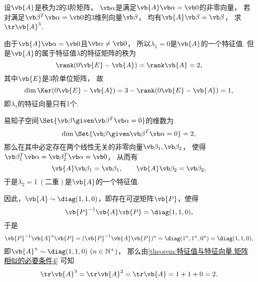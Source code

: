 \begin{example}
设\(\vb{A}\)是秩为2的3阶矩阵，
\(\vb\alpha\)是满足\(\vb{A} \vb\alpha = \vb0\)的非零向量，
若对满足\(\vb\beta^T \vb\alpha = \vb0\)的3维列向量\(\vb\beta\)，
均有\(\vb{A} \vb\beta = \vb\beta\)，
求\(\tr\vb{A}^3\).
\begin{solution}
由于\(\vb{A} \vb\alpha = \vb0\)且\(\vb\alpha \neq \vb0\)，
所以\(\lambda_1 = 0\)是\(\vb{A}\)的一个特征值.
但是\(\vb{A}\)的属于特征值\(\lambda\)的特征矩阵的秩为\[
	\rank(0\vb{E}-\vb{A})
	= \rank\vb{A}
	= 2,
\]
其中\(\vb{E}\)是3阶单位矩阵，
故\[
	\dim\Ker(0\vb{E}-\vb{A})
	= 3 - \rank(0\vb{E}-\vb{A})
	= 1,
\]
即\(\lambda_1\)的特征向量只有1个.

易知子空间\(\Set{\vb\beta \given \vb\beta^T \vb\alpha = 0}\)的维数为\[
	\dim\Set{\vb\beta \given \vb\beta^T \vb\alpha = 0} = 2,
\]
那么在其中必定存在两个线性无关的非零向量\(\vb\beta_1,\vb\beta_2\)，
使得\(\vb\beta_1^T \vb\alpha
= \vb\beta_2^T \vb\alpha
= \vb0\)，
从而有\[
	\vb{A}\vb\beta_1 = \vb\beta_1,
	\qquad
	\vb{A}\vb\beta_2 = \vb\beta_2,
\]
于是\(\lambda_2 = 1\ (\text{二重})\)是\(\vb{A}\)的一个特征值.

因此，\(\vb{A} \sim \diag(1,1,0)\)，即存在可逆矩阵\(\vb{P}\)，使得\[
	\vb{P}^{-1} \vb{A} \vb{P}
	= \diag(1,1,0),
\]
于是\[
	\vb{P}^{-1} \vb{A}^n \vb{P}
	= (\vb{P}^{-1} \vb{A} \vb{P})^n
	= \diag(1^n,1^n,0^n)
	= \diag(1,1,0),
\]
即\(\vb{A}^n \sim \diag(1,1,0)\ (n\in\mathbb{N}^+)\)，
那么由\cref{theorem:特征值与特征向量.矩阵相似的必要条件4}
可知\[
	\tr\vb{A}^3
	= \tr\vb{A}^2
	= \tr\vb{A}
	= 1+1+0
	= 2.
\]
\end{solution}
\end{example}

